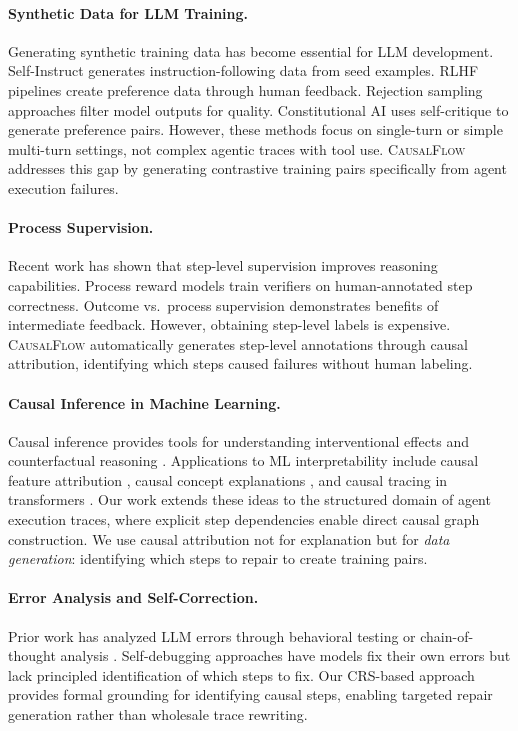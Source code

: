 \documentclass{article}
\theoremstyle{plain}
\theoremstyle{definition}
\theoremstyle{remark}
\begin{document}
\paragraph{Synthetic Data for LLM Training.}
Generating synthetic training data has become essential for LLM development. Self-Instruct \cite{wang2023selfinstruct} generates instruction-following data from seed examples. RLHF pipelines \cite{ouyang2022training} create preference data through human feedback. Rejection sampling approaches \cite{yuan2023scaling} filter model outputs for quality. Constitutional AI \cite{bai2022constitutional} uses self-critique to generate preference pairs. However, these methods focus on single-turn or simple multi-turn settings, not complex agentic traces with tool use. \textsc{CausalFlow} addresses this gap by generating contrastive training pairs specifically from agent execution failures.

\paragraph{Process Supervision.}
Recent work has shown that step-level supervision improves reasoning capabilities. Process reward models \cite{lightman2023lets} train verifiers on human-annotated step correctness. Outcome vs.\ process supervision \cite{uesato2022solving} demonstrates benefits of intermediate feedback. However, obtaining step-level labels is expensive. \textsc{CausalFlow} automatically generates step-level annotations through causal attribution, identifying which steps caused failures without human labeling.

\paragraph{Causal Inference in Machine Learning.}
Causal inference provides tools for understanding interventional effects and counterfactual reasoning \cite{pearl2009causality,peters2017elements}. Applications to ML interpretability include causal feature attribution \cite{schwab2019cxplain}, causal concept explanations \cite{goyal2019explaining}, and causal tracing in transformers \cite{meng2022locating}. Our work extends these ideas to the structured domain of agent execution traces, where explicit step dependencies enable direct causal graph construction. We use causal attribution not for explanation but for \emph{data generation}: identifying which steps to repair to create training pairs.

\paragraph{Error Analysis and Self-Correction.}
Prior work has analyzed LLM errors through behavioral testing \cite{ribeiro2020beyond} or chain-of-thought analysis \cite{wei2022chain}. Self-debugging approaches \cite{chen2024teaching} have models fix their own errors but lack principled identification of which steps to fix. Our CRS-based approach provides formal grounding for identifying causal steps, enabling targeted repair generation rather than wholesale trace rewriting.
\end{document}
